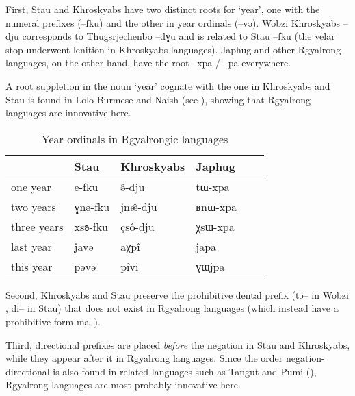 \documentclass[oneside,a4paper,11pt]{article}
\newcommand{\ipa}[1]{{\phon #1}} %
\begin{document}
First, Stau and Khroskyabs have two distinct roots for `year', one with the numeral prefixes (\ipa{--fku}) and the other in year ordinals (\ipa{--və}). Wobzi Khroskyabs \ipa{--dju} corresponds to Thugsrjechenbo \ipa{--dɣu} and is related to Stau \ipa{--fku} (the velar stop underwent lenition in Khroskyabs languages). Japhug and other Rgyalrong languages, on the other hand, have the root \ipa{--xpa} / \ipa{--pa} everywhere. 

A root suppletion in the noun `year' cognate with the one in Khroskyabs and Stau is found in Lolo-Burmese and Naish (see \citealt{jacques.michaud11naish}), showing that Rgyalrong languages are innovative here.

  \begin{table}[h]
  \caption{Year ordinals in Rgyalrongic languages} \label{tab:year} \centering
 \begin{tabular}{llllll}
 \toprule
 & 	Stau & 	Khroskyabs & 	Japhug & 	\\	
 \midrule
one year & 	\ipa{e-fku} & 	\ipa{ə̂-dju } & 	\ipa{tɯ-xpa} & 	\\	
two years & 	\ipa{ɣnə-fku} & 	\ipa{jnæ̂-dju } & 	\ipa{ʁnɯ-xpa} & 	\\	
three years & 	\ipa{xsʚ-fku} & 	\ipa{çsô-dju } & 	\ipa{χsɯ-xpa} & 	\\	
 \midrule
last year & 	\ipa{javə} & 	\ipa{aχpî} & 	\ipa{japa} & 	\\	
this year & 	\ipa{pəvə} & 	\ipa{pîvi} & 	\ipa{ɣɯjpa} & 	\\	
\bottomrule
\end{tabular}
\end{table}


Second, Khroskyabs and Stau preserve the prohibitive dental prefix (\ipa{tə--} in Wobzi \citealt[130-1]{lai13affixale}, \ipa{di--} in Stau) that does not exist in Rgyalrong languages (which instead have a prohibitive form \ipa{ma--}).

Third, directional prefixes are placed \textit{before} the negation in Stau and Khroskyabs, while they appear after it in Rgyalrong languages. Since the order negation-directional is also found in related languages such as Tangut and Pumi (\citealt{jacques11tangut.verb}), Rgyalrong languages are most probably innovative here.



\end{document}
